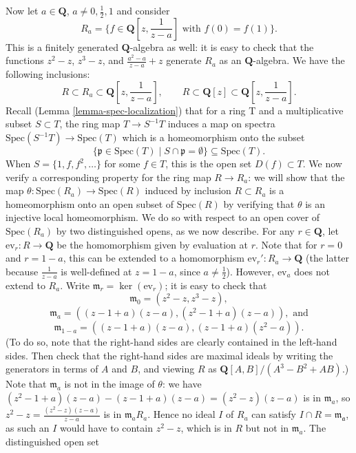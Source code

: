 \begin{example}
\medskip\noindent Now let $a \in \mathbf{Q}$, $a \neq 0, \frac{1}{2}, 1$ and
consider
$$
R_a = \{ f \in \mathbf{Q}[z, \frac{1}{z-a}]\text{ with }f(0) = f(1)
\}.
$$
This is a finitely generated $\mathbf{Q}$-algebra as well: it is
easy to check that the functions $z^2-z$, $z^3-z$, and
$\frac{a^2-a}{z-a}+z$ generate $R_a$ as an $\mathbf{Q}$-algebra.  We
have the following inclusions:
$$
R\subset R_a\subset\mathbf{Q}[z, \frac{1}{z-a}], \qquad
R\subset\mathbf{Q}[z]\subset\mathbf{Q}[z, \frac{1}{z-a}].
$$
Recall (Lemma \ref{lemma-spec-localization}) that for a ring T and a
multiplicative subset $S\subset T$, the ring map $T\to S^{-1}T$
induces a map on spectra $\text{Spec}(S^{-1}T)\to\text{Spec}(T)$
which is a homeomorphism onto the subset
$$
\{\mathfrak p \in \text{Spec}(T) \mid S \cap \mathfrak p = \emptyset
\}\subseteq\text{Spec}(T).
$$
When $S = \lbrace 1, f, f^2, \ldots\rbrace$ for some $f\in T$, this is
the open set $D(f)\subset T$.  We now verify a corresponding
property for the ring map $R\to R_a$: we will show that the map
$\theta : \text{Spec}(R_a)\to\text{Spec}(R)$ induced by inclusion
$R\subset R_a$ is a homeomorphism onto an open subset of
$\text{Spec}(R)$ by verifying that $\theta$ is an injective local
homeomorphism.  We do so with respect to an open cover of
$\text{Spec}(R_a)$ by two distinguished opens, as we now describe.
For any $r\in\mathbf{Q}$, let $\text{ev}_r : R\to\mathbf{Q}$ be the
homomorphism given by evaluation at $r$.  Note that for $r = 0$ and
$r = 1-a$, this can be extended to a homomorphism
$\text{ev}_r' : R_a\to\mathbf{Q}$ (the latter because $\frac{1}{z-a}$
is well-defined at $z = 1-a$, since $a\neq\frac{1}{2}$).  However,
$\text{ev}_a$ does not extend to $R_a$.  Write
$\mathfrak{m}_r = \ker(\text{ev}_r)$; it is easy to check that
$$
\mathfrak{m}_0 = (z^2-z, z^3-z),
$$
$$
\mathfrak{m}_a = ((z-1 + a)(z-a), (z^2-1 + a)(z-a)), \text{ and}
$$
$$
\mathfrak{m}_{1-a} = ((z-1 + a)(z-a), (z-1 + a)(z^2-a)).
$$
(To do so, note that the right-hand sides are clearly contained in
the left-hand sides.  Then check that the right-hand sides are
maximal ideals by writing the generators in terms of $A$ and $B$,
and viewing $R$ as $\mathbf{Q}[A, B]/(A^3-B^2 + AB)$.) Note that
$\mathfrak{m}_a$ is not in the image of $\theta$: we have
$(z^2-1 + a)(z-a)-(z-1 + a)(z-a) = (z^2-z)(z-a)$ is in $\mathfrak{m}_a$,
so $z^2-z = \frac{(z^2-z)(z-a)}{z-a}$ is in $\mathfrak{m}_aR_a$. Hence
no ideal $I$ of $R_a$ can satisfy $I\cap R = \mathfrak{m_a}$, as such
an $I$ would have to contain $z^2-z$, which is in $R$ but not in
$\mathfrak{m}_a$.  The distinguished open set

\end{example}
